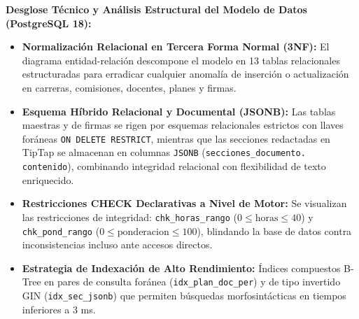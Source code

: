 \documentclass[12pt,a4paper]{article}
\begin{document}
\noindent
\noindent
\textbf{Desglose Técnico y Análisis Estructural del Modelo de Datos (PostgreSQL 18):}
\begin{itemize}[leftmargin=1.5em, itemsep=3pt]
    \item \textbf{Normalización Relacional en Tercera Forma Normal (3NF):} El diagrama entidad-relación descompone el modelo en 13 tablas relacionales estructuradas para erradicar cualquier anomalía de inserción o actualización en carreras, comisiones, docentes, planes y firmas.
    \item \textbf{Esquema Híbrido Relacional y Documental (JSONB):} Las tablas maestras y de firmas se rigen por esquemas relacionales estrictos con llaves foráneas \texttt{ON DELETE RESTRICT}, mientras que las secciones redactadas en TipTap se almacenan en columnas \texttt{JSONB} (\texttt{secciones\_\allowbreak  documento. contenido}), combinando integridad relacional con flexibilidad de texto enriquecido.
    \item \textbf{Restricciones CHECK Declarativas a Nivel de Motor:} Se visualizan las restricciones de integridad: \texttt{chk\_\allowbreak  horas\_\allowbreak  rango} ($0 \le \text{horas} \le 40$) y \texttt{chk\_\allowbreak  pond\_\allowbreak  rango} ($0 \le \text{ponderacion} \le 100$), blindando la base de datos contra inconsistencias incluso ante accesos directos.
    \item \textbf{Estrategia de Indexación de Alto Rendimiento:} Índices compuestos B-Tree en pares de consulta foránea (\texttt{idx\_\allowbreak  plan\_\allowbreak  doc\_\allowbreak  per}) y de tipo invertido GIN (\texttt{idx\_\allowbreak  sec\_\allowbreak  jsonb}) que permiten búsquedas morfosintácticas en tiempos inferiores a 3 ms.
\end{itemize}
\end{document}
